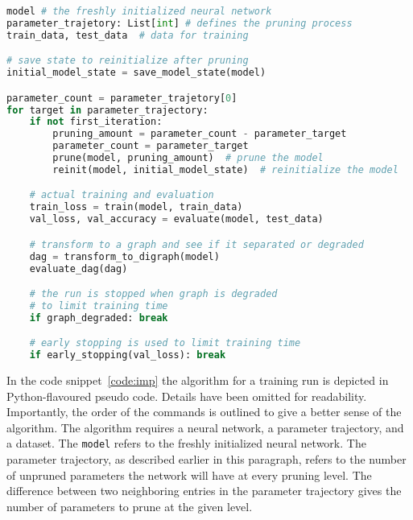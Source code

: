 \begin{minipage}{\linewidth} %
\begin{lstlisting}[language=Python,caption={[Iterative Magnitude Pruning]Iterative magnitude pruning with parameter resetting; Python pseudo code
},captionpos=b, label={code:imp}]
model # the freshly initialized neural network 
parameter_trajetory: List[int] # defines the pruning process
train_data, test_data  # data for training

# save state to reinitialize after pruning
initial_model_state = save_model_state(model)

parameter_count = parameter_trajetory[0]
for target in parameter_trajectory:
    if not first_iteration:
        pruning_amount = parameter_count - parameter_target
        parameter_count = parameter_target
        prune(model, pruning_amount)  # prune the model 
        reinit(model, initial_model_state)  # reinitialize the model

    # actual training and evaluation
    train_loss = train(model, train_data)
    val_loss, val_accuracy = evaluate(model, test_data)

    # transform to a graph and see if it separated or degraded
    dag = transform_to_digraph(model)
    evaluate_dag(dag)

    # the run is stopped when graph is degraded 
    # to limit training time
    if graph_degraded: break

    # early stopping is used to limit training time
    if early_stopping(val_loss): break
\end{lstlisting}
\end{minipage}

In the code snippet~\ref{code:imp} the algorithm for a training run is depicted in Python-flavoured pseudo code.
Details have been omitted for readability.
Importantly, the order of the commands is outlined to give a better sense of the algorithm.
The algorithm requires a neural network, a parameter trajectory, and a dataset.
The \lstinline{model} refers to the freshly initialized neural network.
The parameter trajectory, as described earlier in this paragraph, refers to the number of unpruned parameters the network will have at every pruning level.
The difference between two neighboring entries in the parameter trajectory gives the number of parameters to prune at the given level.
    
